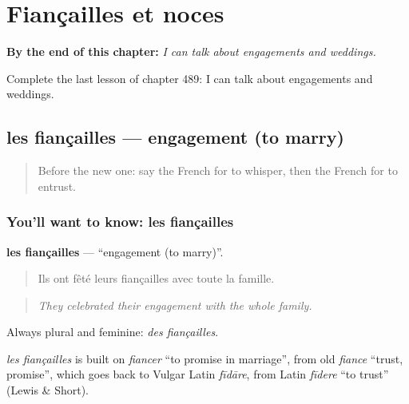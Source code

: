 
\chapter{Fiançailles et noces}
\label{ch:fr-fiancailles-et-noces}

\begin{chapteropening}
\textbf{By the end of this chapter:} \emph{I can talk about engagements and weddings.}

Complete the last lesson of chapter 489: I can talk about engagements and weddings.
\end{chapteropening}

\section[les fiançailles]{les fiançailles — engagement (to marry)}

\label{lesson:FR-C489-fiancailles}



\begin{quote}
Before the new one: say the French for to whisper, then the French for to entrust.
\end{quote}

\subsection*{You'll want to know: les fiançailles}
\textbf{les fiançailles} — \textquotedblleft{}engagement (to marry)\textquotedblright{}.

\begin{quote}
Ils ont fêté leurs fiançailles avec toute la famille.
\end{quote}

\begin{quote}
\emph{They celebrated their engagement with the whole family.}
\end{quote}

Always plural and feminine: \emph{des fiançailles}.

\begin{cousinweb}
\emph{les fiançailles} is built on \emph{fiancer} \textquotedblleft{}to promise in marriage\textquotedblright{}, from old \emph{fiance} \textquotedblleft{}trust, promise\textquotedblright{}, which goes back to Vulgar Latin \emph{fīdāre}, from Latin \emph{fīdere} \textquotedblleft{}to trust\textquotedblright{} (Lewis \& Short).
\end{cousinweb}

